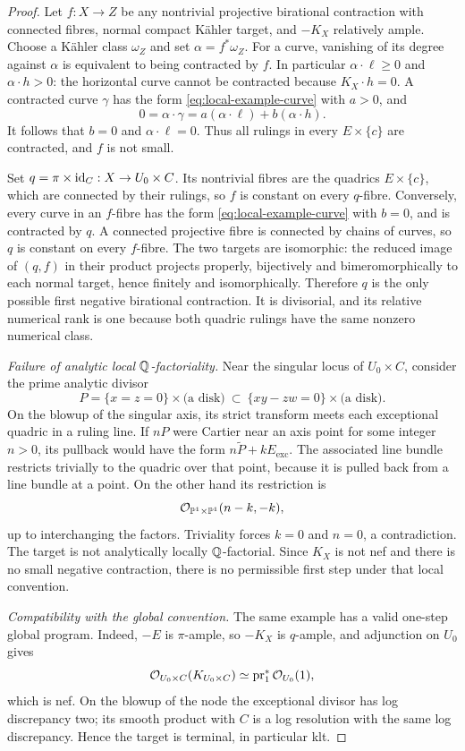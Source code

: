 \begin{proof}
Let $f:X\to Z$ be any nontrivial projective birational contraction with
connected fibres, normal compact Kähler target, and $-K_X$ relatively
ample.  Choose a Kähler class $\omega_Z$ and set $\alpha=f^*\omega_Z$.
For a curve, vanishing of its degree against $\alpha$ is equivalent to
being contracted by $f$.
In particular $\alpha\cdot\ell\geq0$ and $\alpha\cdot h>0$: the
horizontal curve cannot be contracted because $K_X\cdot h=0$.
A contracted curve $\gamma$ has the form
\eqref{eq:local-example-curve} with $a>0$, and
\[
 0=\alpha\cdot\gamma
   =a(\alpha\cdot\ell)+b(\alpha\cdot h).
\]
It follows that $b=0$ and $\alpha\cdot\ell=0$.
Thus all rulings in every $E\times\{c\}$ are contracted, and $f$ is not
small.

Set $q=\pi\times\mathrm{id}_C:X\to U_0\times C$.
Its nontrivial fibres are the quadrics $E\times\{c\}$, which are connected
by their rulings, so $f$ is constant on every $q$-fibre.
Conversely, every curve in an $f$-fibre has the form
\eqref{eq:local-example-curve} with $b=0$, and is contracted by $q$.
A connected projective fibre is connected by chains of curves, so $q$ is
constant on every $f$-fibre.  The two targets are isomorphic: the reduced
image of $(q,f)$ in their product projects properly, bijectively and
bimeromorphically to each normal target, hence finitely and isomorphically.
Therefore $q$ is the only possible first negative birational contraction.
It is divisorial, and its relative numerical rank is one because both
quadric rulings have the same nonzero numerical class.

\emph{Failure of analytic local $\mathbb Q$-factoriality.}
Near the singular locus of $U_0\times C$, consider the prime analytic
divisor
\[
 P=\{x=z=0\}\times\text{(a disk)}
   \ \subset\ \{xy-zw=0\}\times\text{(a disk)}.
\]
On the blowup of the singular axis, its strict transform meets each
exceptional quadric in a ruling line.  If $nP$ were Cartier near an axis
point for some integer $n>0$, its pullback would have the form
$n\widetilde P+kE_{\mathrm{exc}}$.
The associated line bundle restricts trivially to the quadric over that
point, because it is pulled back from a line bundle at a point.
On the other hand its restriction is
\[
 \mathcal O_{\mathbb P^1\times\mathbb P^1}(n-k,-k),
\]
up to interchanging the factors.  Triviality forces $k=0$ and $n=0$, a
contradiction.  The target is not analytically locally $\mathbb Q$-factorial.
Since $K_X$ is not nef and there is no small negative contraction,
there is no permissible first step under that local convention.

\emph{Compatibility with the global convention.}
The same example has a valid one-step global program.  Indeed,
$-E$ is $\pi$-ample, so $-K_X$ is $q$-ample, and adjunction on $U_0$ gives
\[
 \mathcal O_{U_0\times C}(K_{U_0\times C})
 \simeq\operatorname{pr}_1^*\mathcal O_{U_0}(1),
\]
which is nef.  On the blowup of the node the exceptional divisor has log
discrepancy two; its smooth product with $C$ is a log resolution with the
same log discrepancy.  Hence the target is terminal, in particular klt.


\end{proof}
